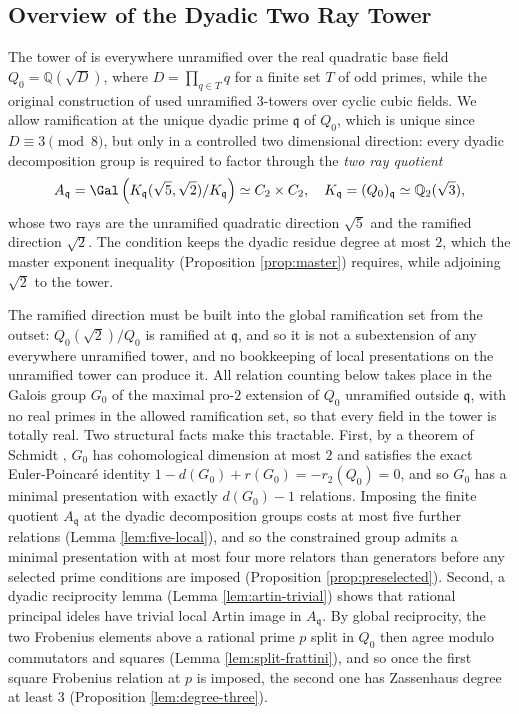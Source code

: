 \subsection{Overview of the Dyadic Two Ray Tower}

The tower of \cite[Lemmas 11 and 12]{Sawin} is everywhere unramified
over the real quadratic base field $Q_{0}=\mathbb{Q}(\sqrt{D})$, where
$D=\prod_{q\in T}q$ for a finite set $T$ of odd primes, while the
original construction of \cite{OpenAIUnitDistance} used unramified
$3$-towers over cyclic cubic fields. We allow ramification at the unique
dyadic prime $\mathfrak{q}$ of $Q_{0}$, which is unique since
$D\equiv3\pmod 8$, but only in a controlled two dimensional direction:
every dyadic decomposition group is required to factor through the
\emph{two ray quotient}
\[
A_{\mathfrak{q}}=\Gal\left(K_{\mathfrak{q}}(\sqrt{5},\sqrt{2})/K_{\mathfrak{q}}\right)\simeq C_{2}\times C_{2},\ \ \ K_{\mathfrak{q}}=(Q_{0})_{\mathfrak{q}}\simeq\mathbb{Q}_{2}(\sqrt{3}),
\]
whose two rays are the unramified quadratic direction $\sqrt{5}$ and the
ramified direction $\sqrt{2}$. The condition keeps the dyadic residue
degree at most $2$, which the master exponent inequality (Proposition
\ref{prop:master}) requires, while adjoining $\sqrt{2}$ to the tower.

The ramified direction must be built into the global ramification set
from the outset: $Q_{0}(\sqrt{2})/Q_{0}$ is ramified at $\mathfrak{q}$,
and so it is not a subextension of any everywhere unramified tower, and
no bookkeeping of local presentations on the unramified tower can
produce it. All relation counting below takes place in the Galois group
$G_{0}$ of the maximal pro-$2$ extension of $Q_{0}$ unramified outside
$\mathfrak{q}$, with no real primes in the allowed ramification set, so
that every field in the tower is totally real. Two structural facts make
this tractable. First, by a theorem of Schmidt \cite{Schmidt}, $G_{0}$
has cohomological dimension at most $2$ and satisfies the exact
Euler-Poincar\'e identity $1-d(G_{0})+r(G_{0})=-r_{2}(Q_{0})=0$, and so
$G_{0}$ has a minimal presentation with exactly $d(G_{0})-1$ relations.
Imposing the finite quotient $A_{\mathfrak{q}}$ at the dyadic
decomposition groups costs at most five further relations (Lemma
\ref{lem:five-local}), and so the constrained group admits a minimal
presentation with at most four more relators than generators before any
selected prime conditions are imposed (Proposition
\ref{prop:preselected}). Second, a dyadic reciprocity lemma (Lemma
\ref{lem:artin-trivial}) shows that rational principal ideles have
trivial local Artin image in $A_{\mathfrak{q}}$. By global reciprocity,
the two Frobenius elements above a rational prime $p$ split in $Q_{0}$
then agree modulo commutators and squares (Lemma
\ref{lem:split-frattini}), and so once the first square Frobenius
relation at $p$ is imposed, the second one has Zassenhaus degree at
least $3$ (Proposition \ref{lem:degree-three}).

